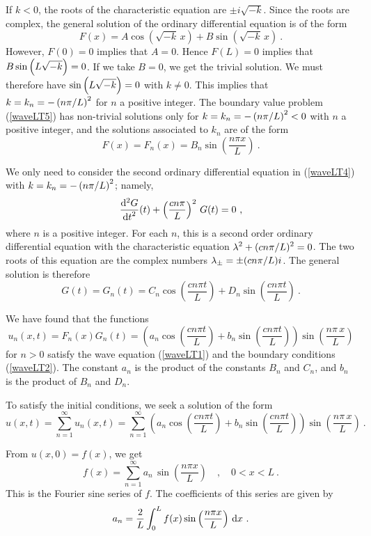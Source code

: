 If $k<0$, the roots of the characteristic equation are $\pm i \sqrt{-k}$.
Since the roots are complex, the general solution of the ordinary
differential equation is of the form
\[
F(x) = A \cos\left(\sqrt{-k}\,x\right) + B \sin\left(\sqrt{-k}\,x\right) \ .
\]
However, $F(0)=0$ implies that $A =0$.  Hence $F(L)=0$ implies that
$\displaystyle B \sin\left(L\sqrt{-k}\right) = 0$.  If we take $B=0$,
we get the trivial solution.  We must therefore have
$\displaystyle \sin\left(L\sqrt{-k}\right) = 0$ with $k\neq 0$.  This implies
that $\displaystyle k = k_n = -\left(n\pi/L\right)^2$ for $n$ a
positive integer.  The boundary value problem (\ref{waveLT5}) has non-trivial
solutions only for $\displaystyle k=k_n=-\left(n\pi/L\right)^2<0$ with
$n$ a positive integer, and the solutions associated to $k_n$ are of the form
\[
F(x)=F_n(x) = B_n \sin\left(\frac{n\pi x}{L}\right) \ .
\]

We only need to consider the second ordinary differential equation in
(\ref{waveLT4}) with $\displaystyle k=k_n=-\left(n\pi/L\right)^2$;
namely,
\[
\displaystyle \frac{\mathrm{d}^{2}{G}} {\displaystyle \mathrm{d}{t}^{2}}(t) + \left(\frac{c n\pi}{L}\right)^2\,G(t) = 0 \ ,
\]
where $n$ is a positive integer.  For each $n$, this is a second order
ordinary differential equation with the characteristic equation
$\displaystyle \lambda^2 + (c n\pi/L)^2=0$.  The two
roots of this equation are the complex numbers
$\displaystyle \lambda_{\pm} = \pm (c n\pi/L)i$.
The general solution is therefore
\[
G(t) = G_n(t) = C_n \cos\left(\frac{cn\pi t}{L}\right)
+ D_n \sin\left(\frac{cn\pi t}{L}\right) \ .
\]

We have found that the functions
\[
u_n(x,t) = F_n(x)G_n(t) =
\left( a_n \cos\left(\frac{cn\pi t}{L}\right)
+ b_n \sin\left(\frac{cn\pi t}{L}\right) \right)
\sin\left(\frac{n\pi\,x}{L}\right)
\]
for $n>0$ satisfy the wave equation (\ref{waveLT1}) and the boundary
conditions (\ref{waveLT2}).   The constant $a_n$ is the product of the
constants $B_n$ and $C_n$, and $b_n$ is the product of $B_n$ and $D_n$.

To satisfy the initial conditions, we seek a solution of the form
\[
u(x,t) = \sum_{n=1}^\infty u_n(x,t)
= \sum_{n=1}^\infty
\left( a_n \cos\left(\frac{cn\pi t}{L}\right)
+ b_n \sin\left(\frac{cn\pi t}{L}\right) \right)
\sin\left(\frac{n\pi\,x}{L}\right) \ .
\]

From $u(x,0) = f(x)$, we get
\[
f(x) = \sum_{n=1}^\infty a_n\,\sin\left(\frac{n\pi x}{L}\right)
\quad , \quad 0<x<L \ .
\]
This is the Fourier sine series of $f$.  The coefficients of
this series are given by
\[
a_n = \frac{2}{L} \int_0^L f(x)
\sin\left(\frac{n\pi x}{L}\right) \,\mathrm{d}x \ .
\]

